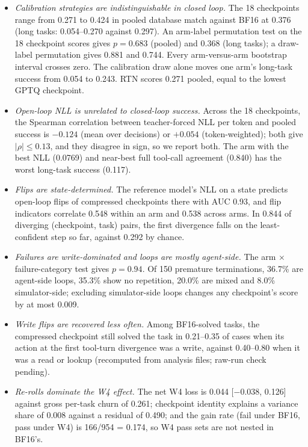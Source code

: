 \begin{itemize}[leftmargin=*,itemsep=1pt,topsep=2pt]
\item \emph{Calibration strategies are indistinguishable in closed loop.} The 18 checkpoints range from 0.271 to 0.424 in pooled database match against BF16 at 0.376 (long tasks: 0.054--0.270 against 0.297). An arm-label permutation test on the 18 checkpoint scores gives $p = 0.683$ (pooled) and 0.368 (long tasks); a draw-label permutation gives 0.881 and 0.744. Every arm-versus-arm bootstrap interval crosses zero. The calibration draw alone moves one arm's long-task success from 0.054 to 0.243. RTN scores 0.271 pooled, equal to the lowest GPTQ checkpoint.
\item \emph{Open-loop NLL is unrelated to closed-loop success.} Across the 18 checkpoints, the Spearman correlation between teacher-forced NLL per token and pooled success is $-0.124$ (mean over decisions) or $+0.054$ (token-weighted); both give $|\rho| \le 0.13$, and they disagree in sign, so we report both. The arm with the best NLL (0.0769) and near-best full tool-call agreement (0.840) has the worst long-task success (0.117).
\item \emph{Flips are state-determined.} The reference model's NLL on a state predicts open-loop flips of compressed checkpoints there with AUC 0.93, and flip indicators correlate 0.548 within an arm and 0.538 across arms. In 0.844 of diverging (checkpoint, task) pairs, the first divergence falls on the least-confident step so far, against 0.292 by chance.
\item \emph{Failures are write-dominated and loops are mostly agent-side.} The arm $\times$ failure-category test gives $p = 0.94$. Of 150 premature terminations, 36.7\% are agent-side loops, 35.3\% show no repetition, 20.0\% are mixed and 8.0\% simulator-side; excluding simulator-side loops changes any checkpoint's score by at most 0.009.
\item \emph{Write flips are recovered less often.} Among BF16-solved tasks, the compressed checkpoint still solved the task in 0.21--0.35 of cases when its action at the first tool-turn divergence was a write, against 0.40--0.80 when it was a read or lookup (recomputed from analysis files; raw-run check pending).
\item \emph{Re-rolls dominate the W4 effect.} The net W4 loss is 0.044 [$-0.038$, 0.126] against gross per-task churn of 0.261; checkpoint identity explains a variance share of 0.008 against a residual of 0.490; and the gain rate (fail under BF16, pass under W4) is 166/954 = 0.174, so W4 pass sets are not nested in BF16's.
\end{itemize}

